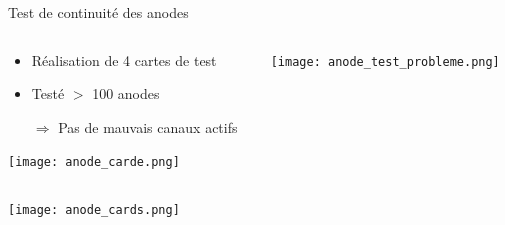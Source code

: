     \begin{frame}{Test de continuité des anodes}
        \begin{scriptsize}
            \begin{columns}
                \begin{column}{0.5\textwidth}
                    \begin{itemize}
                        \item Réalisation de 4 cartes de test
                        \item Testé $>$ 100 anodes
                        \item[$\Rightarrow$] Pas de mauvais canaux actifs
                    \end{itemize}
                    \texttt{[image: anode\_carde.png]}
                \end{column}
                \begin{column}{0.5\textwidth}
                    \vspace{0.92cm}
                    \centering\texttt{[image: anode\_test\_probleme.png]}
                \end{column}
            \end{columns}
            \vspace{0.2cm}
           	\begin{center}
           	    \texttt{[image: anode\_cards.png]}
           	\end{center}
        \end{scriptsize}
    \end{frame}

